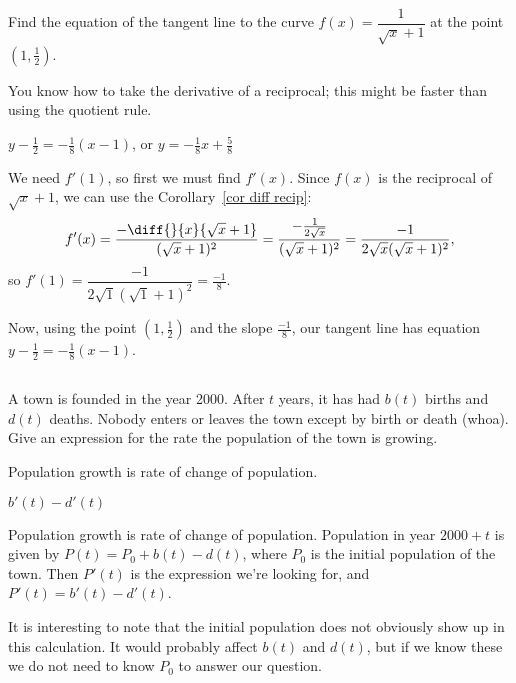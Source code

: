 \begin{Mquestion}Find the equation of the tangent line to the curve $f(x)=\dfrac{1}{\sqrt{x}+1}$ at the point $\left(1,\frac{1}{2}\right)$.
\end{Mquestion}
\begin{hint} You know how to take the derivative of a reciprocal; this might be faster than using the quotient rule.
\end{hint}
\begin{answer} $y-\frac{1}{2}=-\frac{1}{8}(x-1)$, or $y=-\tfrac{1}{8}x +\tfrac{5}{8}$
\end{answer}
\begin{solution}
We need $f'(1)$, so first we must find $f'(x)$. Since $f(x)$ is the reciprocal of $\sqrt{x}+1$, we can use the Corollary~\ref*{cor diff recip}: %
\[f'(x) = \dfrac{-\diff{}{x}\{\sqrt{x}+1\}}{(\sqrt{x}+1)^2}=\dfrac{-\frac{1}{2\sqrt{x}}}{(\sqrt{x}+1)^2}= \dfrac{-1}{2\sqrt{x}(\sqrt{x}+1)^2},\] so $f'(1)=\dfrac{-1}{2\sqrt{1}(\sqrt{1}+1)^2}=\frac{-1}{8}.$

Now, using the point $\left(1,\frac{1}{2}\right)$ and the slope $\frac{-1}{8}$, our tangent line has equation $y-\frac{1}{2}=-\frac{1}{8}(x-1)$.
\end{solution}







\subsection*{\Application}

\begin{Mquestion}A town is founded in the year 2000. After $t$ years, it has had $b(t)$ births and $d(t)$ deaths. Nobody enters or leaves the town except by birth or death (whoa). Give an expression for the rate the population of the town is growing.
\end{Mquestion}
\begin{hint} Population growth is rate of change of population.
\end{hint}
\begin{answer} $b'(t)-d'(t)$
\end{answer}
\begin{solution} Population growth is rate of change of population.
Population in year $2000+t$ is given by $P(t)=P_0+b(t)-d(t)$, where $P_0$ is the initial population of the town. Then $P'(t)$ is the expression we're looking for, and $P'(t)=b'(t)-d'(t)$.

It is interesting to note that the initial population does not obviously show up in this calculation. It would probably affect $b(t)$ and $d(t)$, but if we know these we do not need to know $P_0$ to answer our question.
\end{solution}


